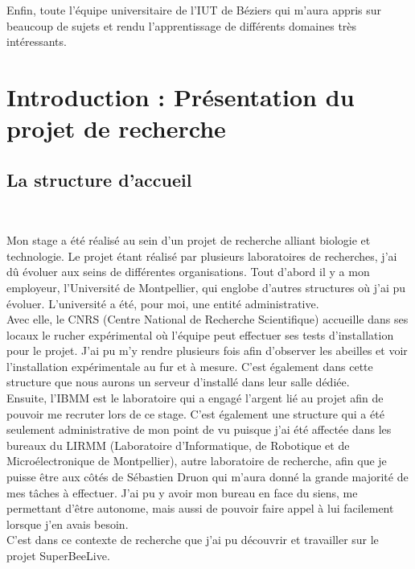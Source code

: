 \documentclass[11pt,french,a4paper]{report}
\begin{document}
Enfin, toute l'équipe universitaire de l'IUT de Béziers qui m'aura appris sur beaucoup de sujets et rendu l'apprentissage
de différents domaines très intéressants. 

\tableofcontent

\clearpage

\chapter{Introduction : Présentation du projet de recherche}
\section{La structure d'accueil} 

Mon stage a été réalisé au sein d'un projet de recherche alliant biologie et technologie. 
Le projet étant réalisé par plusieurs laboratoires de recherches, j'ai dû évoluer aux seins de différentes organisations. 
Tout d'abord il y a mon employeur, l'Université de Montpellier, qui englobe d'autres structures où j'ai pu évoluer. 
L'université a été, pour moi, une entité administrative. \\ 
Avec elle, le CNRS (Centre National de Recherche Scientifique) accueille dans ses locaux le rucher expérimental où 
l'équipe peut effectuer ses tests d'installation pour le projet. J'ai pu m'y rendre plusieurs fois afin d'observer les abeilles
et voir l'installation expérimentale au fur et à mesure. C'est également dans cette structure que nous aurons un serveur 
d'installé dans leur salle dédiée.\\

Ensuite, l'IBMM est le laboratoire qui a engagé l'argent lié au projet afin de pouvoir me recruter lors de ce stage. 
C'est également une structure qui a été seulement administrative de mon point de vu puisque j'ai été affectée dans 
les bureaux du LIRMM (Laboratoire d'Informatique, de Robotique et de Microélectronique de Montpellier), autre laboratoire de 
recherche, afin que je puisse être aux côtés de Sébastien Druon qui m'aura donné la grande majorité de mes tâches à effectuer. 
J'ai pu y avoir mon bureau en face du siens, me permettant d'être autonome, mais aussi de pouvoir faire
appel à lui facilement lorsque j'en avais besoin.\\

C'est dans ce contexte de recherche que j'ai pu découvrir et travailler sur le projet SuperBeeLive. \\ 
\end{document}
